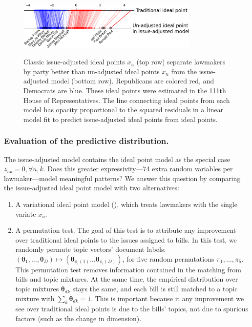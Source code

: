 \begin{figure}
  \center
  \includegraphics[width=0.8\textwidth]{chapter_spatial_voting_with_text/figures/3393_issue_vs_ideal_sxs.pdf}
  \label{fig:jackman_vs_offset}
  \caption{Classic issue-adjusted ideal points $x_u$ (top row) separate lawmakers by party better than un-adjusted ideal points $x_u$ from the
    issue-adjusted model (bottom row).  Republicans are colored red,
    and Democrats are blue.  These ideal points were estimated in
    the 111th House of Representatives.  The line connecting ideal points from
    each model has opacity proportional to the squared residuals in a linear
    model fit to predict issue-adjusted ideal points from ideal
    points. }
\end{figure}

\subsubsection{Evaluation of the predictive distribution.}

The issue-adjusted model contains the ideal point model as the
special case $z_{uk}=0, \forall u, k$. Does this greater
expressivity---74 extra random variables per lawmaker---model
meaningful patterns?  We answer this question by comparing the
issue-adjusted ideal point model with two alternatives:

\begin{enumerate}
\item A variational ideal point model (), which treats
  lawmakers with the single variate $x_u$.

\item A permutation test.  The goal of this test is to attribute any
  improvement over traditional ideal points to the issues assigned to
  bills.  In this test, we randomly permute topic vectors' document
  labels: $(\bm \theta_1, \ldots, \bm \theta_D) \mapsto (\bm
  \theta_{\pi_i(1)} \ldots \bm \theta_{\pi_i(D)})$, for five random
  permutations $\pi_1, \ldots, \pi_{5}$.  This permutation test
  removes information contained in the matching from bills and topic
  mixtures.  At the same time, the empirical distribution over topic
  mixtures $\bm \theta_{dk}$ stays the same, and each bill is still
  matched to a topic mixture with $\sum_k \bm \theta_{dk} = 1$.  This
  is important because it any improvement we see over traditional
  ideal points is due to the bills' topics, not due to spurious
  factors (such as the change in dimension).
\end{enumerate}

